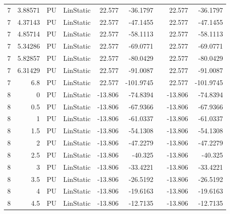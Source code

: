 \begin{table}[htbp]
{\begin{tabular}{rrrlrrrrr}
    \multicolumn{1}{l}{7} & 3.88571 & \multicolumn{1}{l}{PU} & LinStatic & 22.577 & -36.1797 &     & 22.577 & -36.1797 \\
    \multicolumn{1}{l}{7} & 4.37143 & \multicolumn{1}{l}{PU} & LinStatic & 22.577 & -47.1455 &     & 22.577 & -47.1455 \\
    \multicolumn{1}{l}{7} & 4.85714 & \multicolumn{1}{l}{PU} & LinStatic & 22.577 & -58.1113 &     & 22.577 & -58.1113 \\
    \multicolumn{1}{l}{7} & 5.34286 & \multicolumn{1}{l}{PU} & LinStatic & 22.577 & -69.0771 &     & 22.577 & -69.0771 \\
    \multicolumn{1}{l}{7} & 5.82857 & \multicolumn{1}{l}{PU} & LinStatic & 22.577 & -80.0429 &     & 22.577 & -80.0429 \\
    \multicolumn{1}{l}{7} & 6.31429 & \multicolumn{1}{l}{PU} & LinStatic & 22.577 & -91.0087 &     & 22.577 & -91.0087 \\
    \multicolumn{1}{l}{7} & 6.8 & \multicolumn{1}{l}{PU} & LinStatic & 22.577 & -101.9745 &     & 22.577 & -101.9745 \\
    \multicolumn{1}{l}{8} & 0   & \multicolumn{1}{l}{PU} & LinStatic & -13.806 & -74.8394 &     & -13.806 & -74.8394 \\
    \multicolumn{1}{l}{8} & 0.5 & \multicolumn{1}{l}{PU} & LinStatic & -13.806 & -67.9366 &     & -13.806 & -67.9366 \\
    \multicolumn{1}{l}{8} & 1   & \multicolumn{1}{l}{PU} & LinStatic & -13.806 & -61.0337 &     & -13.806 & -61.0337 \\
    \multicolumn{1}{l}{8} & 1.5 & \multicolumn{1}{l}{PU} & LinStatic & -13.806 & -54.1308 &     & -13.806 & -54.1308 \\
    \multicolumn{1}{l}{8} & 2   & \multicolumn{1}{l}{PU} & LinStatic & -13.806 & -47.2279 &     & -13.806 & -47.2279 \\
    \multicolumn{1}{l}{8} & 2.5 & \multicolumn{1}{l}{PU} & LinStatic & -13.806 & -40.325 &     & -13.806 & -40.325 \\
    \multicolumn{1}{l}{8} & 3   & \multicolumn{1}{l}{PU} & LinStatic & -13.806 & -33.4221 &     & -13.806 & -33.4221 \\
    \multicolumn{1}{l}{8} & 3.5 & \multicolumn{1}{l}{PU} & LinStatic & -13.806 & -26.5192 &     & -13.806 & -26.5192 \\
    \multicolumn{1}{l}{8} & 4   & \multicolumn{1}{l}{PU} & LinStatic & -13.806 & -19.6163 &     & -13.806 & -19.6163 \\
    \multicolumn{1}{l}{8} & 4.5 & \multicolumn{1}{l}{PU} & LinStatic & -13.806 & -12.7135 &     & -13.806 & -12.7135 \\

\end{tabular}}
\end{table}
